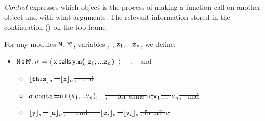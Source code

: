 \noindent 

\vspace{.2cm} \noindent
\textit{Control} expresses which object is the process of making a function call on another object and
with what arguments. The relevant information
 stored in the continuation () on the top frame.
\begin{definition}[%
\st{Control}]  \label{def:valid:assertion:control}
\sout{For any modules $\M$, $\M'$,  variables  , \y, $\prg{z}_1,...\prg{z}_n$, we define$:$}
\begin{itemize}
   \item \sout{
$\M\mkpair \M', \sigma \models  \Calls {\prg{x}}  {\prg{m}} {\prg{y}}  {\z_1,...\z_n}$ \IFF \ \ ,\ \  and }
\begin{itemize}
\item
\sout{$\interp{\prg{this}}{\sigma}$=$\interp{\prg{x}}{\sigma}$, \ and}
\item
\sout{$\sigma.\prg{contn}$=${\uu.\m(\v_1,..\v_n);\_}$,\ \ \ for some  $\uu$,$\v_1$,... $\v_n$, \ and}
\item
\sout{ $\interp{\prg{y}}{\sigma}$=$\interp{\prg{u}}{\sigma}$,\ \ \ and \ \ \ 
  $\interp{\z_i}{\sigma}$=$\interp{{\prg{v}_i}}{\sigma}$, for all  $i$.}
 \end{itemize}
  \end{itemize}
\end{definition}
